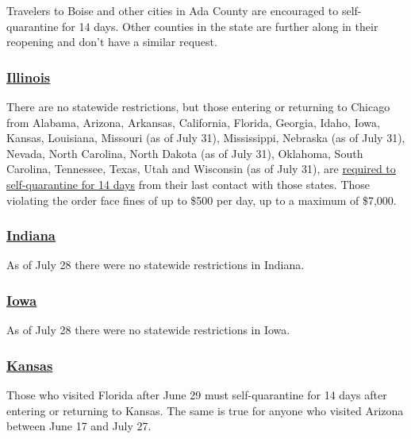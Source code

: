 Travelers to Boise and other cities in Ada County are encouraged to
self-quarantine for 14 days. Other counties in the state are further
along in their reopening and don't have a similar request.

\hypertarget{illinois}{%
\subsubsection{\texorpdfstring{\href{https://www.dph.illinois.gov/topics-services/diseases-and-conditions/diseases-a-z-list/coronavirus/travel-guidance}{Illinois}}{Illinois}}\label{illinois}}

There are no statewide restrictions, but those entering or returning to
Chicago from Alabama, Arizona, Arkansas, California, Florida, Georgia,
Idaho, Iowa, Kansas, Louisiana, Missouri (as of July 31), Mississippi,
Nebraska (as of July 31), Nevada, North Carolina, North Dakota (as of
July 31), Oklahoma, South Carolina, Tennessee, Texas, Utah and Wisconsin
(as of July 31), are
\href{https://www.chicago.gov/city/en/sites/covid-19/home.html}{required
to self-quarantine for 14 days} from their last contact with those
states. Those violating the order face fines of up to \$500 per day, up
to a maximum of \$7,000.

\hypertarget{indiana}{%
\subsubsection{\texorpdfstring{\href{https://www.coronavirus.in.gov}{Indiana}}{Indiana}}\label{indiana}}

As of July 28 there were no statewide restrictions in Indiana.

\hypertarget{iowa}{%
\subsubsection{\texorpdfstring{\href{https://www.traveliowa.com/aspx/general/dynamicpage.aspx?id=204}{Iowa}}{Iowa}}\label{iowa}}

As of July 28 there were no statewide restrictions in Iowa.

\hypertarget{kansas}{%
\subsubsection{\texorpdfstring{\href{https://www.coronavirus.kdheks.gov/175/Travel-Exposure-Related-Isolation-Quaran}{Kansas}}{Kansas}}\label{kansas}}

Those who visited Florida after June 29 must self-quarantine for 14 days
after entering or returning to Kansas. The same is true for anyone who
visited Arizona between June 17 and July 27.

